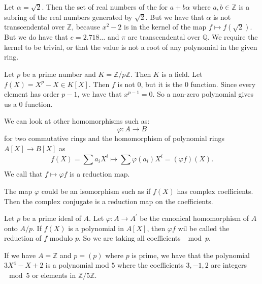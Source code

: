 \documentclass{report}
\begin{document}
\begin{examples}
    \begin{example}
        Let $\alpha = \sqrt{2}$. Then the set of real numbers of the for $a + b\alpha$ where $a, b \in \mathbb{Z}$ is a subring of the real numbers generated by $\sqrt{2}$. But we have that $\alpha$ is not transcendental over $\mathbb{Z}$, because $x^{2} - 2$ is in the kernel of the map $f \mapsto f(\sqrt{2})$. But we do have that $e = 2.718 \ldots$ and $\pi$ are transcendental over $\mathbb{Q}$. We require the kernel to be trivial, or that the value is not a root of any polynomial in the given ring.
    \end{example}
    
    \begin{example}
        Let $p$ be a prime number and $K = \mathbb{Z}/p\mathbb{Z}$. Then $K$ is a field. Let $f(X) = X^{p} - X \in K[X]$. Then $f$ is not 0, but it is the 0 function. Since every element has order $p - 1$, we have that $x^{p - 1} = 0$. So a non-zero polynomial gives us a 0 function.
    \end{example}
\end{examples}

We can look at other homomorphisms such as:
    \begin{equation*}
        \varphi: A \rightarrow B
    \end{equation*}
for two commutative rings and the homomorphism of polynomial rings $A[X] \rightarrow B[X]$ as 
    \begin{equation*}
        f(X) = \sum_{}^{} a_{i}X^{i} \mapsto \sum_{}^{} \varphi(a_{i})X^{i} = (\varphi f)(X).
    \end{equation*}
We call that $f \mapsto \varphi f$ is a reduction map.

\begin{examples}
    \begin{example}
        The map $\varphi$ could be an isomorphism such as if $f(X)$ has complex coefficients. Then the complex conjugate is a reduction map on the coefficients.
    \end{example}

    \begin{example}
        Let $p$ be a prime ideal of $A$. Let $\varphi: A \rightarrow A^{\prime}$ be the canonical homomorphism of $A$ onto $A/p$. If $f(X)$ is a polynomial in $A[X]$, then $\varphi f$ wil be called the reduction of $f$ modulo $p$. So we are taking all coefficients $\mod{p}$.
    \end{example}

    \begin{example}
        If we have $A = \mathbb{Z}$ and $p = (p)$ where $p$ is prime, we have that the polynomial $3X^{4} - X + 2$ is a polynomial mod $5$ where the coefficients $3, -1, 2$ are integers $\mod{5}$ or elements in $\mathbb{Z}/5\mathbb{Z}$.
    \end{example}
\end{examples}
\end{document}
